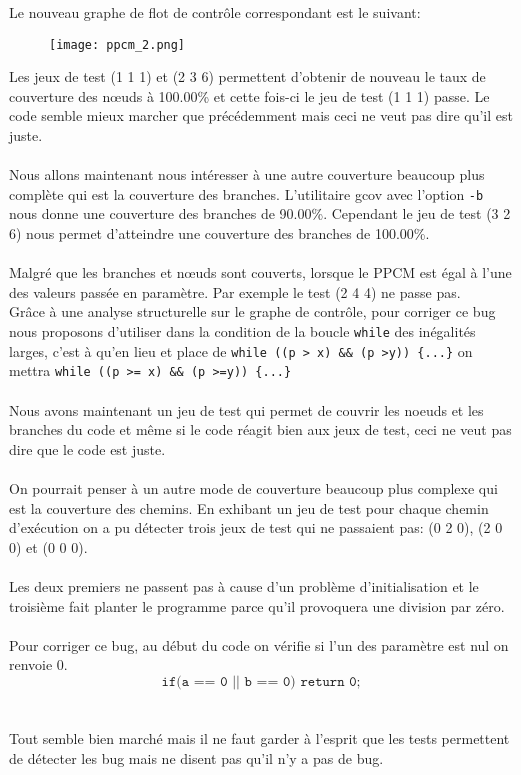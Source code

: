 \documentclass{article}
\begin{document}
Le nouveau graphe de flot de contrôle correspondant est le suivant:
 \begin{figure}[H]
    \centering
    \texttt{[image: ppcm\_2.png]}
 \end{figure}
\noindent
Les jeux de test \textsf{(1 1 1)} et \textsf{(2 3 6)} permettent d'obtenir de nouveau le taux de couverture des nœuds à 100.00\% et cette fois-ci le jeu de test \textsf(1 1 1) passe. Le code semble mieux marcher que précédemment mais ceci ne veut pas dire qu'il est juste.   
\\
\\
Nous allons maintenant nous intéresser à une autre couverture beaucoup plus complète qui est la couverture des branches. L'utilitaire \textsf{gcov} avec l'option \texttt{-b} nous donne une couverture des branches de 90.00\%. Cependant le jeu de test (3 2 6) nous permet d'atteindre une couverture des branches de 100.00\%.
\\
\\
Malgré que les branches et nœuds sont couverts, lorsque le PPCM est égal à l’une des valeurs passée en paramètre. Par exemple le test \textsf{(2 4 4)} ne passe pas.
\\
Grâce à une analyse structurelle sur le graphe de contrôle, pour corriger ce bug nous proposons d'utiliser dans la condition de la boucle \texttt{while} des inégalités larges, c'est à qu'en lieu et place de \texttt{while ((p > x) \&\& (p >y)) \{...\}} on mettra \texttt{while ((p >= x) \&\& (p >=y)) \{...\}}
\\
\\
Nous avons maintenant un jeu de test qui permet de couvrir les noeuds et les branches du code et même si le code réagit bien aux jeux de test, ceci ne veut pas dire que le code est juste.
\\
\\
On pourrait penser à un autre mode de couverture beaucoup plus complexe qui est la couverture des chemins. En exhibant un jeu de test pour chaque chemin d'exécution on a pu détecter trois jeux de test qui ne passaient pas: \textsf{(0 2 0)}, \textsf{(2 0 0)} et \textsf{(0 0 0)}. 
\\
\\
Les deux premiers ne passent pas à cause d'un problème d'initialisation et le troisième fait planter le programme parce qu'il provoquera une division par zéro.
\\
\\
Pour corriger ce bug, au début du code on vérifie si l'un des paramètre est nul on renvoie 0.\[\texttt{if(a == 0 || b == 0) return 0;}\]
\\
\\
Tout semble bien marché mais il ne faut garder à l'esprit que les tests permettent de détecter les bug mais ne disent pas qu'il n'y a pas de bug.  
\end{document}

